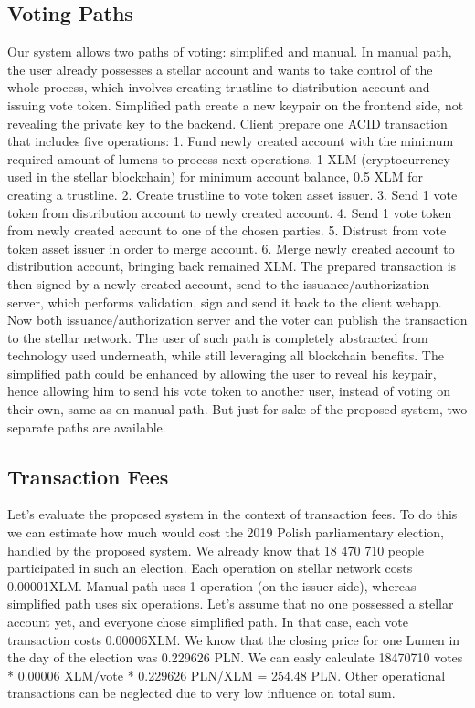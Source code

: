 \documentclass[runningheads]{llncs}
\begin{document}
\subsection{Voting Paths}
Our system allows two paths of voting: simplified and manual. In manual path, the user already possesses a stellar account and wants to take control of the whole process, which involves creating trustline to distribution account and issuing vote token. Simplified path create a new keypair on the frontend side, not revealing the private key to the backend. Client prepare one ACID transaction that includes five operations:
1. Fund newly created account with the minimum required amount of lumens to process next operations. 1 XLM (cryptocurrency used in the stellar blockchain) for minimum account balance, 0.5 XLM for creating a trustline.
2. Create trustline to vote token asset issuer.
3. Send 1 vote token from distribution account to newly created account.
4. Send 1 vote token from newly created account to one of the chosen parties.
5. Distrust from vote token asset issuer in order to merge account.
6. Merge newly created account to distribution account, bringing back
remained XLM.
The prepared transaction is then signed by a newly created account, send to the issuance/authorization server, which performs validation, sign and send it back to the client webapp. Now both issuance/authorization server and the voter can publish the transaction to the stellar network. The user of such path is completely abstracted from technology used underneath, while still leveraging all blockchain benefits. The simplified path could be enhanced by allowing the user to reveal his keypair, hence allowing him to send his vote token to another user, instead of voting on their own, same as on manual path. But just for sake of the proposed system, two separate paths are available.

\subsection{Transaction Fees}
Let’s evaluate the proposed system in the context of transaction fees. To do this we can estimate how much would cost the 2019 Polish parliamentary election, handled by the proposed system. We already know that 18 470 710 people participated in such an election. Each operation on stellar network costs 0.00001XLM. Manual path uses 1 operation (on the issuer side), whereas simplified path uses six operations. Let’s assume that no one possessed a stellar account yet, and everyone chose simplified path. In that case, each vote transaction costs 0.00006XLM. We know that the closing price for one Lumen in the day of the election was 0.229626 PLN. We can easly calculate 18470710 votes * 0.00006 XLM/vote * 0.229626 PLN/XLM = 254.48 PLN. Other operational transactions can be neglected due to very low influence on total sum.
\end{document}
